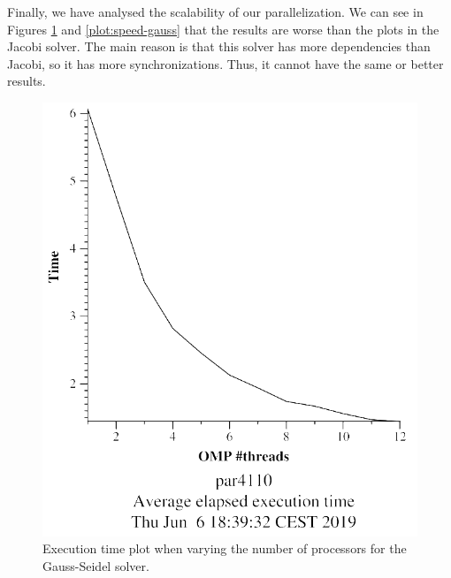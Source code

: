 \documentclass[12pt, a4paper]{article}
\begin{document}
Finally, we have analysed the scalability of our parallelization. We can see in Figures \ref{plot:exe-gauss} and \ref{plot:speed-gauss} that the results are worse than the plots in the Jacobi solver. The main reason is that this solver has more dependencies than Jacobi, so it has more synchronizations. Thus, it cannot have the same or better results.

\begin{figure}[H]
\centering
\hspace{-0.5cm}
\begin{minipage}{0.4\linewidth}
  \centering
  \includegraphics[scale=0.5]{./images/heat-omp-strong-gauss-execution-time}
  \caption{Execution time plot when varying the number of processors for the Gauss-Seidel solver.}
  \label{plot:exe-gauss}
\end{minipage}%
\hspace{0.5cm}
\begin{minipage}{0.4\linewidth}
  \centering

\end{minipage}
\end{figure}
\end{document}
